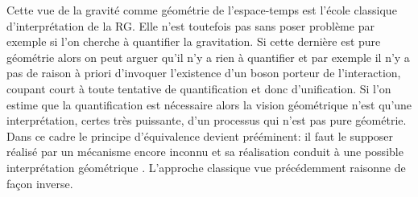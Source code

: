 Cette vue de la gravité comme géométrie de l'espace-temps est l'école classique d'interprétation de la RG. Elle n'est toutefois pas sans poser problème par exemple si l'on cherche à quantifier la gravitation. Si cette dernière est pure géométrie alors on peut arguer qu'il n'y a rien à quantifier et par exemple il n'y a pas de raison à priori d'invoquer l'existence d'un boson porteur de l'interaction, coupant court à toute tentative de quantification et donc d'unification. Si l'on estime que la quantification est nécessaire alors la vision géométrique n'est qu'une interprétation, certes très puissante, d'un processus qui n'est pas pure géométrie. Dans ce cadre le principe d'équivalence devient prééminent: il faut le supposer réalisé par un mécanisme encore inconnu et sa réalisation conduit à une possible interprétation géométrique . L'approche classique vue précédemment raisonne de façon inverse.

